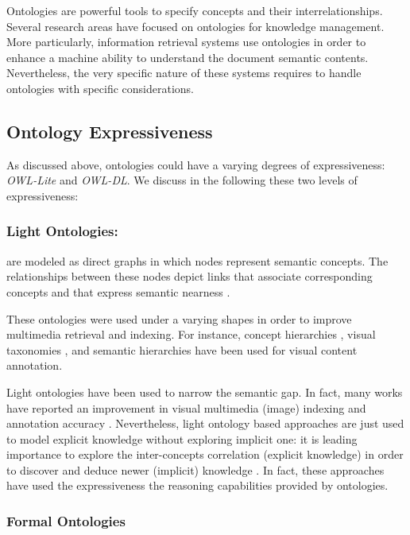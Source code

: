 		Ontologies are powerful tools to specify concepts and their interrelationships. 
		Several research areas have focused on ontologies for knowledge management.
		More particularly, information retrieval systems use ontologies 
		in order to enhance a machine ability to understand  the
		document semantic contents. Nevertheless, the very specific nature of these systems requires to handle 
		ontologies with specific considerations.

	\subsection{Ontology Expressiveness}
		As discussed above, ontologies could have a varying degrees of 
		expressiveness: \emph{OWL-Lite} and \emph{OWL-DL}. We discuss in the 
		following these two levels of expressiveness:

		\subsubsection{Light Ontologies:} are modeled as direct graphs in which nodes 
		represent semantic concepts. The relationships between these nodes depict links that 
		associate corresponding concepts and that express semantic nearness \citep{Reimer2012}. 

		These ontologies were used under a varying shapes in order to improve multimedia 
		retrieval and indexing. For instance, concept hierarchies \citep{Naphade2006,Deng2009}, 
		visual taxonomies \citep{Fei-Fei2005,Griffin2008a,Yao2010}, and semantic hierarchies 
		\citep{Fan2008,Li2010} have been used for visual content annotation.

		Light ontologies have been used to narrow the semantic gap. In fact, many works 
		have reported an improvement in visual multimedia (image) indexing and annotation 
		accuracy \citep{Tousch2008, Yao2010,Martinet2011}. Nevertheless, light ontology 
		based approaches are just used to model explicit knowledge without exploring implicit 
		one: it is leading importance to explore the inter-concepts correlation (explicit knowledge) 
		in order to discover and deduce newer (implicit) knowledge \citep{Bannour2011,Dingli2011}. 
		In fact, these approaches have used  the expressiveness  the reasoning 
		capabilities provided by ontologies.

			
		\subsubsection{Formal Ontologies}


